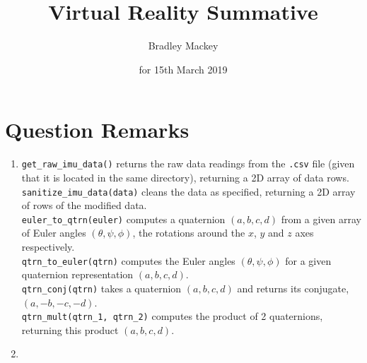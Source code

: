 \documentclass[11pt]{article}
\makeatletter
\newcommand{\skipitems}[1]{%
  \addtocounter{\@enumctr}{#1}%
}
\makeatother
\begin{document}
\title{\textbf{Virtual Reality Summative}}
\date{for 15th March 2019}
\author{Bradley Mackey}
\maketitle


\section*{Question Remarks}

\begin{enumerate}
\item 
\texttt{get\_raw\_imu\_data()} returns the raw data readings from the \texttt{.csv} file (given that it is located in the same directory), returning a 2D array of data rows.\\
\texttt{sanitize\_imu\_data(data)} cleans the data as specified, returning a 2D array of rows of the modified data.\\
\texttt{euler\_to\_qtrn(euler)} computes a quaternion $(a,b,c,d)$ from a given array of Euler angles $(\theta,\psi,\phi)$, the rotations around the $x$, $y$ and $z$ axes respectively.\\
\texttt{qtrn\_to\_euler(qtrn)} computes the Euler angles $(\theta,\psi,\phi)$ for a given quaternion representation $(a,b,c,d)$.\\
\texttt{qtrn\_conj(qtrn)} takes a quaternion $(a,b,c,d)$ and returns its conjugate, $(a,-b,-c,-d)$.\\
\texttt{qtrn\_mult(qtrn\_1, qtrn\_2)} computes the product of 2 quaternions, returning this product $(a,b,c,d)$.

\skipitems{1} 


\item 


\end{enumerate}
\end{document}
